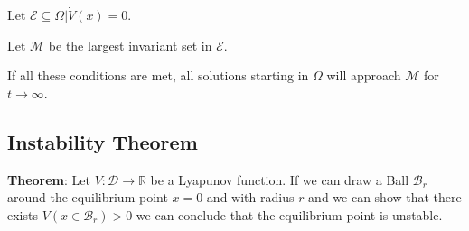 Let $\mathcal{E} \subseteq \Omega | \Dot{V}(x) = 0$.

Let $\mathcal{M}$ be the largest invariant set in $\mathcal{E}$.

If all these conditions are met, all solutions starting in $\Omega$ will approach $\mathcal{M}$ for $t \to \infty$.

\subsection{Instability Theorem}
\textbf{Theorem}: Let $V:\mathcal{D} \to \mathbb{R}$ be a Lyapunov function. If we can draw a Ball $\mathcal{B}_r$ around the equilibrium point $x=0$ and with radius $r$ and we can show that there exists $\Dot{V}(x\in \mathcal{B}_r) > 0$  we can conclude that the equilibrium point is unstable.

